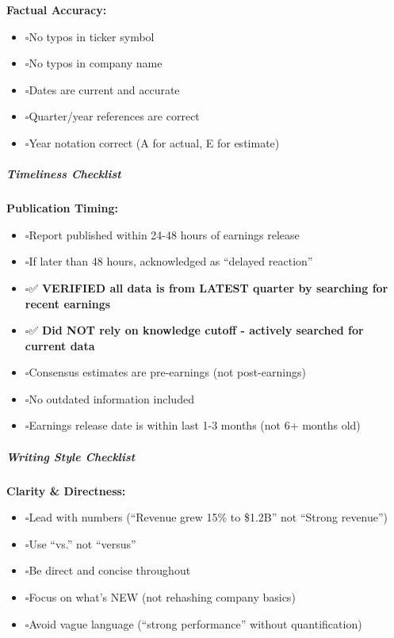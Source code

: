 \documentclass[11pt]{article}
\newcommand{\UncheckedBox}{$\square$}
\begin{document}
\textbf{Factual Accuracy:}

\begin{itemize}[leftmargin=*,itemsep=2pt,topsep=2pt]
\item {} \UncheckedBox No typos in ticker symbol
\item {} \UncheckedBox No typos in company name
\item {} \UncheckedBox Dates are current and accurate
\item {} \UncheckedBox Quarter/year references are correct
\item {} \UncheckedBox Year notation correct (A for actual, E for estimate)
\end{itemize}

\subparagraph{Timeliness Checklist}\mbox{}\par

\textbf{Publication Timing:}

\begin{itemize}[leftmargin=*,itemsep=2pt,topsep=2pt]
\item {} \UncheckedBox Report published within 24-48 hours of earnings release
\item {} \UncheckedBox If later than 48 hours, acknowledged as ``delayed reaction''
\item {} \UncheckedBox ✅ \textbf{VERIFIED all data is from LATEST quarter by searching for recent earnings}
\item {} \UncheckedBox ✅ \textbf{Did NOT rely on knowledge cutoff - actively searched for current data}
\item {} \UncheckedBox Consensus estimates are pre-earnings (not post-earnings)
\item {} \UncheckedBox No outdated information included
\item {} \UncheckedBox Earnings release date is within last 1-3 months (not 6+ months old)
\end{itemize}

\subparagraph{Writing Style Checklist}\mbox{}\par

\textbf{Clarity \& Directness:}

\begin{itemize}[leftmargin=*,itemsep=2pt,topsep=2pt]
\item {} \UncheckedBox Lead with numbers (``Revenue grew 15\% to \$1.2B'' not ``Strong revenue'')
\item {} \UncheckedBox Use ``vs.'' not ``versus''
\item {} \UncheckedBox Be direct and concise throughout
\item {} \UncheckedBox Focus on what's NEW (not rehashing company basics)
\item {} \UncheckedBox Avoid vague language (``strong performance'' without quantification)
\end{itemize}
\end{document}
